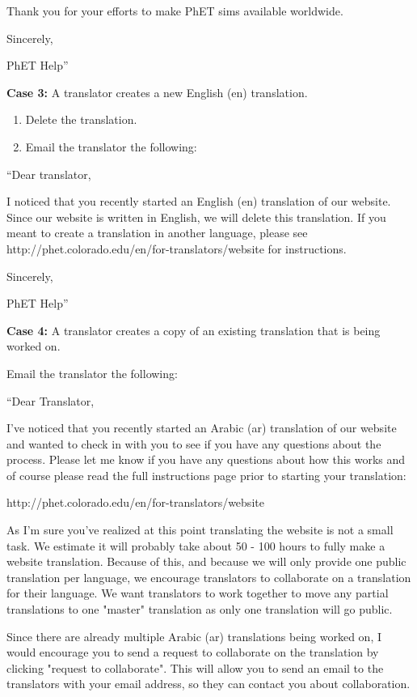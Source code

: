 \documentclass[titlepage]{article}
\begin{document}
Thank you for your efforts to make PhET sims available worldwide.

Sincerely,

PhET Help''

\textbf{Case 3:}
A translator creates a new English (en) translation.
		
		\begin{enumerate}
			\item Delete the translation.
			\item Email the translator the following:
		\end{enumerate}

``Dear translator,

I noticed that you recently started an English (en) translation of our website. Since our website is written in English, we will delete this translation. If you meant to create a translation in another language, please see http://phet.colorado.edu/en/for-translators/website for instructions.

Sincerely,

PhET Help''

\textbf{Case 4:}
A translator creates a copy of an existing translation that is being worked on.

Email the translator the following:

``Dear Translator,

I've noticed that you recently started an Arabic (ar) translation of our website and wanted to check in with you to see if you have any questions about the process.  Please let me know if you have any questions about how this works and of course please read the full instructions page prior to starting your translation:

http://phet.colorado.edu/en/for-translators/website

As I'm sure you've realized at this point translating the website is not a small task.  We estimate it will probably take about 50 - 100 hours to fully make a website translation. Because of this, and because we will only provide one public translation per language, we encourage translators to collaborate on a translation for their language.  We want translators to work together to move any partial translations to one "master" translation as only one translation will go public.

Since there are already multiple Arabic (ar) translations being worked on, I would encourage you to send a request to collaborate on the translation by clicking "request to collaborate". This will allow you to send an email to the translators with your email address, so they can contact you about collaboration.
\end{document}
